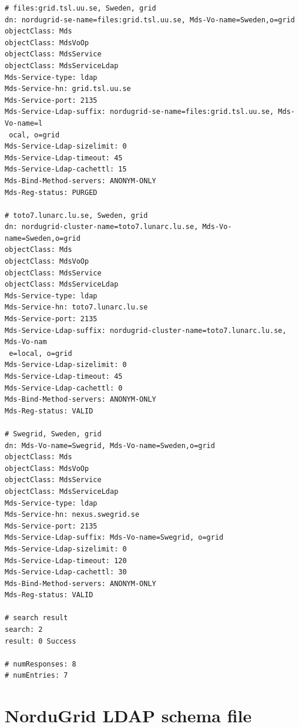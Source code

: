 \documentclass{article}
\begin{document}
\begin{itemize}
\begin{verbatim}
# files:grid.tsl.uu.se, Sweden, grid
dn: nordugrid-se-name=files:grid.tsl.uu.se, Mds-Vo-name=Sweden,o=grid
objectClass: Mds
objectClass: MdsVoOp
objectClass: MdsService
objectClass: MdsServiceLdap
Mds-Service-type: ldap
Mds-Service-hn: grid.tsl.uu.se
Mds-Service-port: 2135
Mds-Service-Ldap-suffix: nordugrid-se-name=files:grid.tsl.uu.se, Mds-Vo-name=l
 ocal, o=grid
Mds-Service-Ldap-sizelimit: 0
Mds-Service-Ldap-timeout: 45
Mds-Service-Ldap-cachettl: 15
Mds-Bind-Method-servers: ANONYM-ONLY
Mds-Reg-status: PURGED

# toto7.lunarc.lu.se, Sweden, grid
dn: nordugrid-cluster-name=toto7.lunarc.lu.se, Mds-Vo-name=Sweden,o=grid
objectClass: Mds
objectClass: MdsVoOp
objectClass: MdsService
objectClass: MdsServiceLdap
Mds-Service-type: ldap
Mds-Service-hn: toto7.lunarc.lu.se
Mds-Service-port: 2135
Mds-Service-Ldap-suffix: nordugrid-cluster-name=toto7.lunarc.lu.se, Mds-Vo-nam
 e=local, o=grid
Mds-Service-Ldap-sizelimit: 0
Mds-Service-Ldap-timeout: 45
Mds-Service-Ldap-cachettl: 0
Mds-Bind-Method-servers: ANONYM-ONLY
Mds-Reg-status: VALID

# Swegrid, Sweden, grid
dn: Mds-Vo-name=Swegrid, Mds-Vo-name=Sweden,o=grid
objectClass: Mds
objectClass: MdsVoOp
objectClass: MdsService
objectClass: MdsServiceLdap
Mds-Service-type: ldap
Mds-Service-hn: nexus.swegrid.se
Mds-Service-port: 2135
Mds-Service-Ldap-suffix: Mds-Vo-name=Swegrid, o=grid
Mds-Service-Ldap-sizelimit: 0
Mds-Service-Ldap-timeout: 120
Mds-Service-Ldap-cachettl: 30
Mds-Bind-Method-servers: ANONYM-ONLY
Mds-Reg-status: VALID

# search result
search: 2
result: 0 Success

# numResponses: 8
# numEntries: 7

\end{verbatim}
\normalsize

\end{itemize}


\newpage


\section{NorduGrid LDAP schema file\label{appendix:schema}}
\tiny
\end{document}
